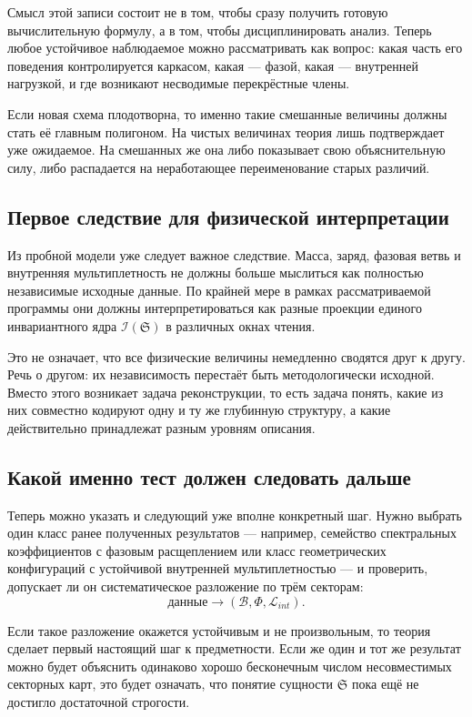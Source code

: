 \documentclass[12pt,a4paper]{article}
\begin{document}
Смысл этой записи состоит не в том, чтобы сразу получить готовую вычислительную формулу, а в том, чтобы дисциплинировать анализ. Теперь любое устойчивое наблюдаемое можно рассматривать как вопрос: какая часть его поведения контролируется каркасом, какая --- фазой, какая --- внутренней нагрузкой, и где возникают несводимые перекрёстные члены.

Если новая схема плодотворна, то именно такие смешанные величины должны стать её главным полигоном. На чистых величинах теория лишь подтверждает уже ожидаемое. На смешанных же она либо показывает свою объяснительную силу, либо распадается на неработающее переименование старых различий.

\subsection{Первое следствие для физической интерпретации}

Из пробной модели уже следует важное следствие. Масса, заряд, фазовая ветвь и внутренняя мультиплетность не должны больше мыслиться как полностью независимые исходные данные. По крайней мере в рамках рассматриваемой программы они должны интерпретироваться как разные проекции единого инвариантного ядра \(\mathcal{I}(\mathfrak{S})\) в различных окнах чтения.

Это не означает, что все физические величины немедленно сводятся друг к другу. Речь о другом: их независимость перестаёт быть методологически исходной. Вместо этого возникает задача реконструкции, то есть задача понять, какие из них совместно кодируют одну и ту же глубинную структуру, а какие действительно принадлежат разным уровням описания.

\subsection{Какой именно тест должен следовать дальше}

Теперь можно указать и следующий уже вполне конкретный шаг. Нужно выбрать один класс ранее полученных результатов --- например, семейство спектральных коэффициентов с фазовым расщеплением или класс геометрических конфигураций с устойчивой внутренней мультиплетностью --- и проверить, допускает ли он систематическое разложение по трём секторам:
\begin{equation}
\text{данные} \longrightarrow (\mathcal{B},\Phi,\mathcal{L}_{int}).
\end{equation}

Если такое разложение окажется устойчивым и не произвольным, то теория сделает первый настоящий шаг к предметности. Если же один и тот же результат можно будет объяснить одинаково хорошо бесконечным числом несовместимых секторных карт, это будет означать, что понятие сущности \(\mathfrak{S}\) пока ещё не достигло достаточной строгости.
\end{document}
